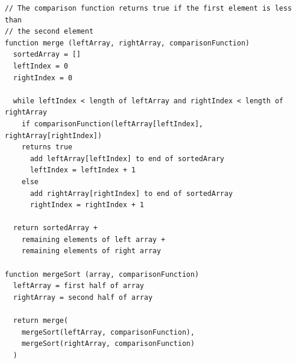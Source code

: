 \documentclass[12pt]{report}
\begin{document}
\begin{verbatim}
// The comparison function returns true if the first element is less than
// the second element
function merge (leftArray, rightArray, comparisonFunction)
  sortedArray = []
  leftIndex = 0
  rightIndex = 0

  while leftIndex < length of leftArray and rightIndex < length of rightArray
    if comparisonFunction(leftArray[leftIndex], rightArray[rightIndex])
    returns true
      add leftArray[leftIndex] to end of sortedArary
      leftIndex = leftIndex + 1
    else
      add rightArray[rightIndex] to end of sortedArray
      rightIndex = rightIndex + 1

  return sortedArray +
    remaining elements of left array +
    remaining elements of right array

function mergeSort (array, comparisonFunction)
  leftArray = first half of array
  rightArray = second half of array

  return merge(
    mergeSort(leftArray, comparisonFunction),
    mergeSort(rightArray, comparisonFunction)
  )
\end{verbatim}

\newpage
\end{document}
